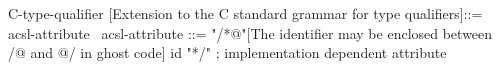 \begin{syntax}
C-type-qualifier [Extension to the C  standard grammar for type qualifiers]::= acsl-attribute
\
acsl-attribute ::= "/*@"[The identifier may be enclosed between /@ and @/ in ghost code] id "*/" ; implementation dependent attribute
\end{syntax}
